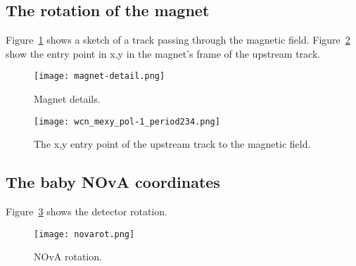   
  
\newpage

\subsection{The rotation of the magnet}

Figure~\ref{fig_magnet} shows a sketch of a track passing through the magnetic field. Figure~\ref{fig_xymag} show the entry point in x,y in the magnet's frame of the upstream track. 

\begin{figure}[h]	   
 \centering
        	\texttt{[image: magnet-detail.png]}	 
   \caption[short]{Magnet details.}
   \label{fig_magnet}
  \end{figure}

       \begin{figure}[h]	   
            \centering
%   
            \texttt{[image: wcn\_mexy\_pol-1\_period234.png]}
   \caption[short]{The x,y entry point of the upstream track to the magnetic field.}
   \label{fig_xymag}
  \end{figure}
  

  
  
  

\subsection{The baby NOvA coordinates}


Figure~\ref{fig_novarot} shows the  detector rotation.

\begin{figure}[h]	   
 \centering
        	\texttt{[image: novarot.png]}	 
   \caption[short]{NOvA rotation.}
   \label{fig_novarot}
  \end{figure}
 
